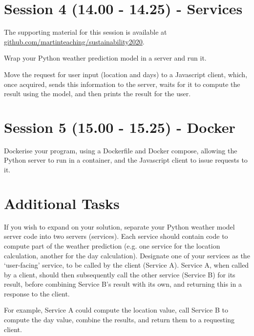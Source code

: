 \documentclass{article}
\begin{document}
\section{Session 4 (14.00 - 14.25) - Services}

The supporting material for this session is available at \href{https://github.com/martinteaching/sustainability2020}{github.com/martinteaching/sustainability2020}.

Wrap your Python weather prediction model in a server and run it.

Move the request for user input (location and days) to a Javascript client,
which, once acquired, sends this information to the server, waits for it to compute
the result using the model, and then prints the result for the user.

\section{Session 5 (15.00 - 15.25) - Docker}

Dockerise your program, using a Dockerfile and Docker compose, allowing the Python server to run in a container, and the Javascript client to issue requests to it.

\section{Additional Tasks}

If you wish to expand on your solution, separate your Python weather model server code into
two servers (services). Each service should contain code to compute part of 
the weather prediction (e.g. one service for the location calculation, another
for the day calculation). Designate one of your services as the `user-facing'
service, to be called by the client (Service A). Service A, when called by a client, should then subsequently call the other service (Service B) for its result, before combining Service B's result with its own, and returning this in a response to the client. 

For example, Service A
could compute the location value, call Service B to compute the day value, combine
the results, and return them to a requesting client.
\end{document}
